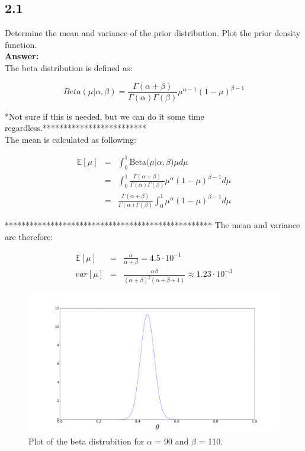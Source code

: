 \documentclass[a4paper]{article}
\begin{document}
\subsection*{2.1}

Determine the mean and variance of the prior distribution. Plot the prior density function.\\

\textbf{Answer:}\\


The beta distribution is defined as:


\begin{equation}
Beta(\mu|\alpha, \beta) = \frac{\Gamma (\alpha + \beta )}{\Gamma(\alpha) \Gamma(\beta)} \mu^{\alpha - 1}(1-\mu)^{\beta - 1}
\end{equation}


*Not sure if this is needed, but we can do it some time regardless.*************************\\
The mean is calculated as following:

\begin{eqnarray}
\mathbb E[\mu] &=& \int_0^{1} \text{Beta(}\mu|\alpha,\beta) \mu d \mu \\
&=& \int_0^1 \frac{\Gamma (\alpha + \beta )}{\Gamma(\alpha) \Gamma(\beta)} \mu^{\alpha}(1-\mu)^{\beta - 1} d\mu \\
&=& \frac{\Gamma (\alpha + \beta )}{\Gamma(\alpha) \Gamma(\beta)} \int_0^1 \mu^{\alpha}(1-\mu)^{\beta - 1} d\mu 
\end{eqnarray}

**************************************************
The mean and variance are therefore:

\begin{eqnarray}
\mathbb E [\mu] &=& \frac{\alpha}{\alpha + \beta } = 4.5\cdot 10^{-1}\\
 var [\mu ] &=& \frac{\alpha \beta}{(\alpha + \beta)^2(\alpha + \beta + 1)} \approx 1.23 \cdot 10^{-3}
\end{eqnarray}

\begin{figure}[H]
\includegraphics[width=\textwidth]{BetaPlotEx2.png}
\caption{Plot of the beta distrubition for $\alpha$ = 90 and $\beta$ = 110.}
\end{figure}
\end{document}
